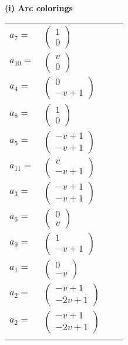 \documentclass[1p]{elsarticle_modified}
\theoremstyle{definition}
\begin{document}
\flushleft \textbf{(i) Arc colorings}\\
\begin{tabular}{m{7pt} m{180pt} m{7pt} m{180pt} }
\flushright $a_{7}=$&$\begin{pmatrix}1\\0\end{pmatrix}$ \\
\flushright $a_{10}=$&$\begin{pmatrix}v\\0\end{pmatrix}$ \\
\flushright $a_{4}=$&$\begin{pmatrix}0\\- v+1\end{pmatrix}$ \\
\flushright $a_{8}=$&$\begin{pmatrix}1\\0\end{pmatrix}$ \\
\flushright $a_{5}=$&$\begin{pmatrix}- v+1\\- v+1\end{pmatrix}$ \\
\flushright $a_{11}=$&$\begin{pmatrix}v\\- v+1\end{pmatrix}$ \\
\flushright $a_{3}=$&$\begin{pmatrix}- v+1\\- v+1\end{pmatrix}$ \\
\flushright $a_{6}=$&$\begin{pmatrix}0\\v\end{pmatrix}$ \\
\flushright $a_{9}=$&$\begin{pmatrix}1\\- v+1\end{pmatrix}$ \\
\flushright $a_{1}=$&$\begin{pmatrix}0\\- v\end{pmatrix}$ \\
\flushright $a_{2}=$&$\begin{pmatrix}- v+1\\-2 v+1\end{pmatrix}$\\ \flushright $a_{2}=$&$\begin{pmatrix}- v+1\\-2 v+1\end{pmatrix}$\\&\end{tabular}
\end{document}
